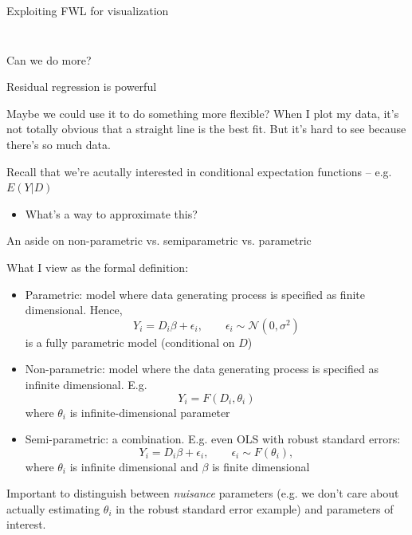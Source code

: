 \documentclass[notes,11pt, aspectratio=169]{beamer}
\newcommand\1{\operatorname{\mathbbm{1}}\indicatorfence}
\newenvironment{wideitemize}{\itemize\addtolength{\itemsep}{10pt}}{\enditemize}
\begin{document}
\begin{frame}{Exploiting FWL for visualization}
\begin{columns}[T]
\begin{column}{.5\textwidth}
{      }
  \end{column}
\end{columns}
\end{frame}


\begin{frame}{Can we do more?}
  \begin{wideitemize}
  \item  Residual regression is powerful
  \item Maybe we could use it to do something more flexible?  When I
    plot my data, it's not totally obvious that a straight line is the
    best fit. But it's hard to see because there's so much data.
  \item   Recall that we're acutally interested in conditional expectation functions -- e.g. $E(Y | D )$
    \begin{itemize}
    \item   What's a way to  approximate this?
    \end{itemize}
  \end{wideitemize}
\end{frame}

\begin{frame}{An aside on non-parametric vs. semiparametric vs. parametric}
  \begin{wideitemize}
  \item What I view as the formal definition:
    \begin{itemize}
    \item Parametric: model where data generating process is specified as finite dimensional. Hence,
      $$ Y_{i} = D_{i}\beta + \epsilon_{i}, \qquad \epsilon_{i} \sim \mathcal{N}(0, \sigma^{2})$$
      is a fully parametric model (conditional on $D$)
    \item Non-parametric: model where the data generating process is specified as infinite dimensional. E.g.
      $$ Y_{i} = F(D_{i},\theta_{i})$$
      where $\theta_{i}$ is infinite-dimensional parameter
    \item Semi-parametric: a combination. E.g. even OLS with robust standard errors:
      $$ Y_{i} = D_{i}\beta + \epsilon_{i}, \qquad \epsilon_{i} \sim F(\theta_{i}),$$
      where $\theta_{i}$ is infinite dimensional and $\beta$ is finite dimensional
    \end{itemize}
  \item Important to distinguish between \emph{nuisance} parameters
    (e.g. we don't care about actually estimating $\theta_{i}$ in the
    robust standard error example) and parameters of interest. 
  \end{wideitemize}
\end{frame}
\end{document}
